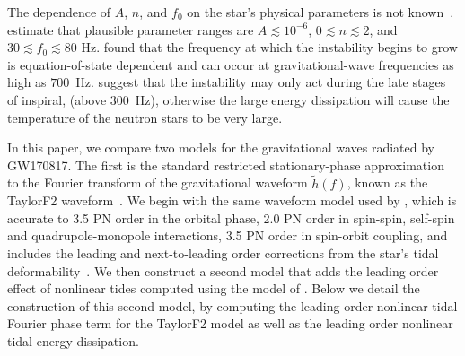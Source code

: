 The dependence of $A$, $n$, and $f_0$ on the star's physical parameters is not known~\citep{Weinberg:2015pxa}. \cite{Essick:2016tkn} estimate that plausible parameter ranges are $A \lesssim 10^{-6}$, $0 \lesssim n \lesssim 2$, and $30 \lesssim f_0 \lesssim 80$ Hz. \cite{Zhou:2018tvc} found that the frequency at which the instability begins to grow is equation-of-state dependent and can occur at gravitational-wave frequencies as high as $700$~Hz. \cite{Andersson:2017iav} suggest that the instability may only act during the late stages of inspiral, (above $300$~Hz), otherwise the large energy dissipation will cause the temperature of the neutron stars to be very large. 

In this paper, we compare two models for the gravitational waves radiated by GW170817. The first is the standard restricted stationary-phase approximation to the Fourier transform of the gravitational waveform $\tilde{h}(f)$, known as the TaylorF2 waveform~\citep{Sathyaprakash:1991mt}. We begin with the same waveform model used by \cite{de2018tidal}, which is accurate to 3.5 PN order in the orbital phase, 2.0 PN order in spin-spin, self-spin and quadrupole-monopole interactions, 3.5 PN order in spin-orbit coupling, and includes the leading and next-to-leading order corrections from the star's tidal deformability~\citep{Kidder:1992fr,Blanchet:1995ez,Blanchet:2004ek,Buonanno:2009zt,Arun:2008kb,Marsat:2013caa,Bohe:2013cla,Bohe:2015ana,Mikoczi:2005dn, Flanagan:2007ix,Vines:2011ud}. We then construct a second model that adds the leading order effect of nonlinear tides computed using the model of \cite{Essick:2016tkn}. Below we detail the construction of this second model, by computing the leading order nonlinear tidal Fourier phase term for the TaylorF2 model as well as the leading order nonlinear tidal energy dissipation.

